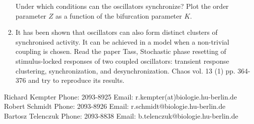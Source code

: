 \documentclass[12pt]{article}
\begin{document}
\begin{enumerate}
        Under which conditions can the oscillators synchronize? Plot
        the order parameter $Z$ as a function of the bifurcation parameter $K$.
    \item It has been shown that oscillators can also form distinct
        clusters of synchronised activity. It can be achieved in a
        model when a non-trivial coupling is chosen. Read the paper
        Tass, Stochastic phase resetting of stimulus-locked responses of two coupled oscillators: transient response clustering, synchronization, and desynchronization. Chaos vol. 13 (1) pp. 364-376
        and try to reproduce its results.
\end{enumerate}

Richard Kempter \hfill Phone: 2093-8925 \hfill
Email: r.kempter(at)biologie.hu-berlin.de \\
Robert Schmidt \hfill Phone: 2093-8926 \hfill
Email: r.schmidt@biologie.hu-berlin.de \\
Bartosz Telenczuk \hfill Phone: 2093-8838 \hfill
Email: b.telenczuk@biologie.hu-berlin.de \\
\end{document}
